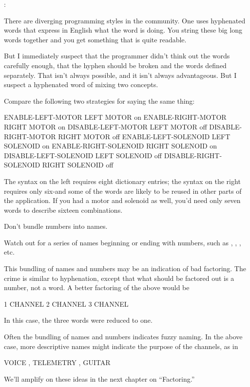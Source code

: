 \begin{interview}
:

\begin{tfquot}
There are diverging programming styles in the \Forth{} community.  One
uses hyphenated words that express in English what the word is doing.
You string these big long words together and you get something that is
quite readable.

But I immediately suspect that the programmer didn't think out the words
carefully enough, that the hyphen should be broken and the words defined
separately.  That isn't always possible, and it isn't always advantageous.
But I suspect a hyphenated word of mixing two concepts.%
\end{tfquot}
\end{interview}
Compare the following two strategies for saying the same thing:
\begin{Code}
ENABLE-LEFT-MOTOR        LEFT MOTOR on
ENABLE-RIGHT-MOTOR       RIGHT MOTOR on
DISABLE-LEFT-MOTOR       LEFT MOTOR off
DISABLE-RIGHT-MOTOR      RIGHT MOTOR off
ENABLE-LEFT-SOLENOID     LEFT SOLENOID on
ENABLE-RIGHT-SOLENOID    RIGHT SOLENOID on
DISABLE-LEFT-SOLENOID    LEFT SOLENOID off
DISABLE-RIGHT-SOLENOID   RIGHT SOLENOID off
\end{Code}
The syntax on the left requires eight dictionary entries; the syntax
on the right requires only six-and some of the words are likely to be
reused in other parts of the application.  If you had a 
motor and solenoid as well, you'd need only seven words to describe
sixteen combinations.%

\begin{tip}
Don't bundle numbers into names.
\end{tip}
Watch out for a series of names beginning or ending with numbers, such
as , , , etc.

%
This bundling of names and numbers may be an indication of bad
factoring.  The crime is similar to hyphenation, except that what
should be factored out is a number, not a word.  A better factoring of
the above would be
\begin{Code}
1 CHANNEL
2 CHANNEL
3 CHANNEL
\end{Code}
In this case, the three words were reduced to one.

Often the bundling of names and numbers indicates fuzzy naming.
In the above case, more descriptive names might indicate the purpose
of the channels, as in
\begin{Code}
VOICE , TELEMETRY , GUITAR
\end{Code}
%
We'll amplify on these ideas in the next chapter on ``Factoring.''%

